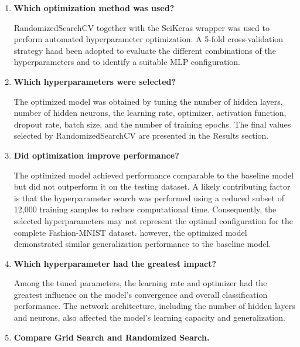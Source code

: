 \documentclass[11pt]{article}
\begin{document}
\begin{enumerate}

\item \textbf{Which optimization method was used?}

RandomizedSearchCV together with the SciKeras wrapper was used to perform automated hyperparameter optimization. A 5-fold cross-validation strategy haad been adopted to evaluate the different combinations of the hyperparameters and to identify a suitable MLP configuration.

\vspace{3mm}

\item \textbf{Which hyperparameters were selected?}

The optimized model was obtained by tuning the number of hidden layers, number of hidden neurons, the learning rate, optimizer, activation function, dropout rate, batch size, and the number of training epochs. The final values selected by RandomizedSearchCV are presented in the Results section.

\vspace{3mm}

\item \textbf{Did optimization improve performance?}

The optimized model achieved performance comparable to the baseline model but did not outperform it on the testing dataset. A likely contributing factor is that the hyperparameter search was performed using a reduced subset of 12,000 training samples to reduce computational time. Consequently, the selected hyperparameters may not represent the optimal configuration for the complete Fashion-MNIST dataset. however, the optimized model demonstrated similar generalization performance to the baseline model.

\vspace{3mm}

\item \textbf{Which hyperparameter had the greatest impact?}

Among the tuned parameters, the learning rate and optimizer had the greatest influence on the model's convergence and overall classification performance. The network architecture, including the number of hidden layers and neurons, also affected the model's learning capacity and generalization.

\vspace{3mm}

\item \textbf{Compare Grid Search and Randomized Search.}


\end{enumerate}
\end{document}

